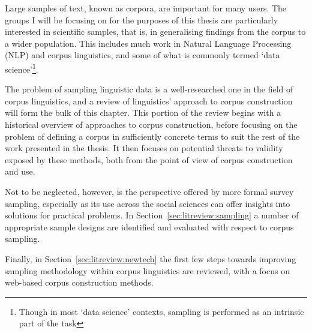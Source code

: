 Large samples of text, known as corpora, are important for many users.  The groups I will be focusing on for the purposes of this thesis are particularly interested in scientific samples, that is, in generalising findings from the corpus to a wider population.  This includes much work in Natural Language Processing (NLP) and corpus linguistics, and some of what is commonly termed `data science'\footnote{Though in most `data science' contexts, sampling is performed as an intrinsic part of the task}.


The problem of sampling linguistic data is a well-researched one in the field of corpus linguistics, and a review of linguistics' approach to corpus construction will form the bulk of this chapter.  This portion of the review begins with a historical overview of approaches to corpus construction, before focusing on the problem of defining a corpus in sufficiently concrete terms to suit the rest of the work presented in the thesis.  It then focuses on potential threats to validity exposed by these methods, both from the point of view of corpus construction and use.

Not to be neglected, however, is the perspective offered by more formal survey sampling, especially as its use across the social sciences can offer insights into solutions for practical problems.  In Section~\ref{sec:litreview:sampling} a number of appropriate sample designs are identified and evaluated with respect to corpus sampling.

Finally, in Section~\ref{sec:litreview:newtech} the first few steps towards improving sampling methodology within corpus linguistics are reviewed, with a focus on web-based corpus construction methods.

